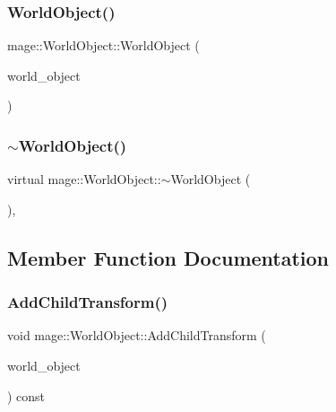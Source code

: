 \subsubsection{\texorpdfstring{World\+Object()}{WorldObject()}\hspace{0.1cm}{\footnotesize\ttfamily [2/2]}}
{\footnotesize\ttfamily mage\+::\+World\+Object\+::\+World\+Object (\begin{DoxyParamCaption}\item[{const \hyperlink{classmage_1_1_world_object}{World\+Object} \&}]{world\+\_\+object }\end{DoxyParamCaption})}

\hypertarget{classmage_1_1_world_object_a6ae28ad98832c1e97b681816755a79f2}{}\label{classmage_1_1_world_object_a6ae28ad98832c1e97b681816755a79f2} 
\subsubsection{\texorpdfstring{$\sim$\+World\+Object()}{~WorldObject()}}
{\footnotesize\ttfamily virtual mage\+::\+World\+Object\+::$\sim$\+World\+Object (\begin{DoxyParamCaption}{ }\end{DoxyParamCaption})\hspace{0.3cm}{\ttfamily [virtual]}, {\ttfamily [default]}}



\subsection{Member Function Documentation}
\hypertarget{classmage_1_1_world_object_a5c66de01e9b83c4c1fa6cd64e17443ee}{}\label{classmage_1_1_world_object_a5c66de01e9b83c4c1fa6cd64e17443ee} 
\subsubsection{\texorpdfstring{Add\+Child\+Transform()}{AddChildTransform()}}
{\footnotesize\ttfamily void mage\+::\+World\+Object\+::\+Add\+Child\+Transform (\begin{DoxyParamCaption}\item[{const \hyperlink{classmage_1_1_world_object}{World\+Object} \&}]{world\+\_\+object }\end{DoxyParamCaption}) const\hspace{0.3cm}{\ttfamily [protected]}}

